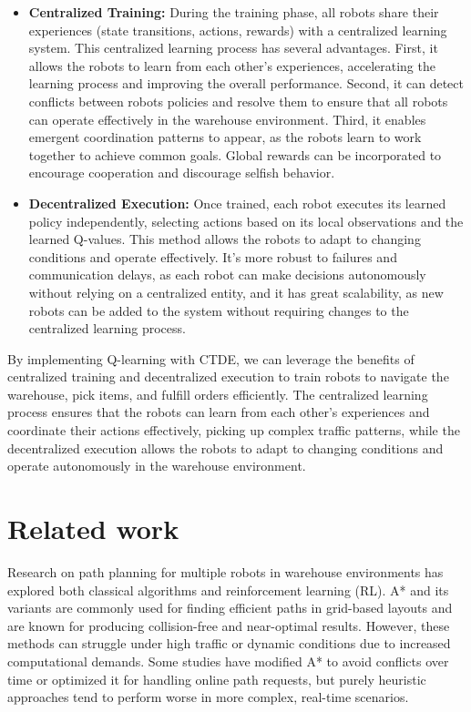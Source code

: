 \documentclass{kththesis}
\begin{document}
\begin{itemize}
    \item \textbf{Centralized Training:} During the training phase, all robots share their experiences (state transitions, actions, rewards) with a centralized learning system. This centralized learning process has several advantages. First, it allows the robots to learn from each other's experiences, accelerating the learning process and improving the overall performance. Second, it can detect conflicts between robots policies and resolve them to ensure that all robots can operate effectively in the warehouse environment. Third, it enables emergent coordination patterns to appear, as the robots learn to work together to achieve common goals. Global rewards can be incorporated to encourage cooperation and discourage selfish behavior.
    \item \textbf{Decentralized Execution:} Once trained, each robot executes its learned policy independently, selecting actions based on its local observations and the learned Q-values. This method allows the robots to adapt to changing conditions and operate effectively. It's more robust to failures and communication delays, as each robot can make decisions autonomously without relying on a centralized entity, and it has great scalability, as new robots can be added to the system without requiring changes to the centralized learning process.
\end{itemize}

By implementing Q-learning with CTDE, we can leverage the benefits of centralized training and decentralized execution to train robots to navigate the warehouse, pick items, and fulfill orders efficiently. The centralized learning process ensures that the robots can learn from each other's experiences and coordinate their actions effectively, picking up complex traffic patterns, while the decentralized execution allows the robots to adapt to changing conditions and operate autonomously in the warehouse environment.


\section{Related work}
Research on path planning for multiple robots in warehouse environments has explored both classical algorithms and reinforcement learning (RL). A* and its variants are commonly used for finding efficient paths in grid-based layouts and are known for producing collision-free and near-optimal results. However, these methods can struggle under high traffic or dynamic conditions due to increased computational demands. Some studies have modified A* to avoid conflicts over time or optimized it for handling online path requests, but purely heuristic approaches tend to perform worse in more complex, real-time scenarios.
\end{document}
